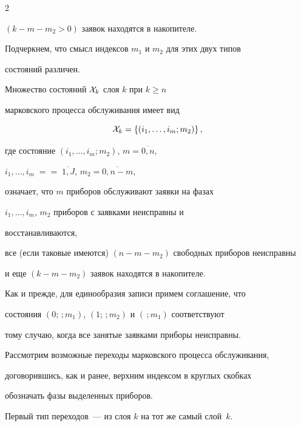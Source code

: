 \begin{multicols}{2}
\begin{itemize}
$(k-m-m_2>0)$ заявок находятся в накопителе.


\end{itemize}





Подчеркнем, что смысл индексов $m_1$ и $m_2$ для этих двух типов


состояний различен.





Множество состояний ${\cal X}_k$ слоя $k$ при $k\ge n$


марковского процесса обслуживания имеет вид


$$


{\cal X}_k


=


\{ (i_1,\ldots, i_m; m_2)\}\,,


$$


где состояние $(i_1,\ldots, i_m; m_2)$, $m=\overline{0,n}$,


$i_1,\ldots,i_m\;=$\linebreak $=\;\overline{1,J}$, $m_2=\overline{0,n-m}$,


означает, что $m$ приборов обслуживают заявки на фазах


$i_1,\ldots, i_m$, $m_2$ приборов с заявками неисправны и


восстанавливаются,


все (если таковые имеются) $(n-m-m_2)$ свободных приборов неисправны


и еще $(k-m-m_2)$ заявок находятся в накопителе.





Как и прежде, для единообразия записи примем соглашение, что


состояния $(0;\,;m_1)$, $(1;\,;m_2)$ и $(\,;m_1)$ соответствуют


тому случаю, когда все занятые заявками приборы неисправны.





Рассмотрим возможные переходы марковского процесса обслуживания,


договорившись, как и ранее, верхним индексом в круглых скобках


обозначать фазы выделенных приборов.





Первый тип переходов~--- из слоя $k$ на тот же самый слой~$k$.






\end{multicols}
